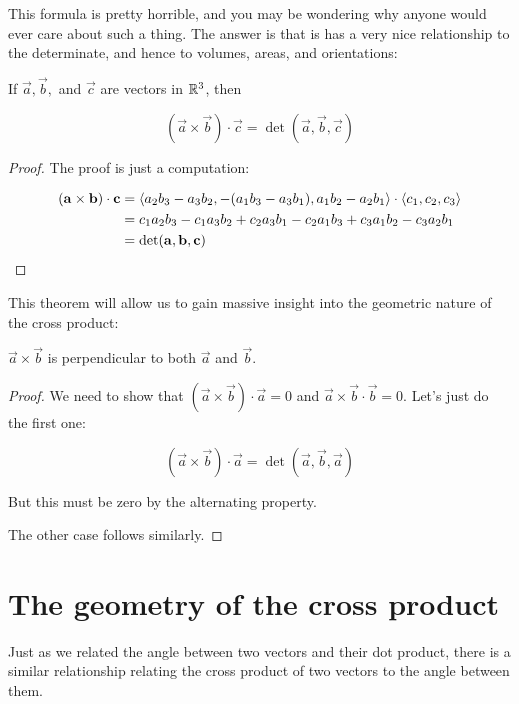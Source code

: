 \documentclass{ximera}
\begin{document}
This formula is pretty horrible, and you may be wondering why anyone
would ever care about such a thing.  The answer is that is has a very
nice relationship to the determinate, and hence to volumes, areas, and
orientations:

\begin{theorem}
  If $\vec{a},\vec{b},$ and $\vec{c}$ are vectors in $\mathbb R^3$, then 
  
  \[
  (\vec{a} \times \vec{b}) \cdot \vec{c} = \det(\vec{a},\vec{b},\vec{c}) 
  \]
\end{theorem}

\begin{proof}
  
  The proof is just a computation:
  
  \begin{align*}
    (\mathbf{a} \times \mathbf{b}) \cdot \mathbf{c} &= \left\langle a_2b_3-a_3b_2, -(a_1b_3-a_3b_1), a_1b_2-a_2b_1\right\rangle \cdot \left\langle c_1,c_2,c_3\right\rangle\\
    &=c_1a_2b_3-c_1a_3b_2+c_2a_3b_1-c_2a_1b_3+c_3a_1b_2-c_3a_2b_1\\
    &=\det(\mathbf{a},\mathbf{b},\mathbf{c}) 
  \end{align*}
\end{proof}

This theorem will allow us to gain massive insight into the geometric nature of the cross product:

\begin{theorem}
  $\vec{a} \times \vec{b}$ is perpendicular to both $\vec{a}$ and $\vec{b}$.
\end{theorem}

\begin{proof}
  We need to show that $(\vec{a} \times \vec{b}) \cdot \vec{a} = 0 $ and $\vec{a} \times \vec{b} \cdot \vec{b} = 0$.  Let's just do the first one:
  
  \[
  (\vec{a} \times \vec{b}) \cdot \vec{a} = \det(\vec{a},\vec{b},\vec{a})
  \]
  
  But this must be zero by the alternating property.
	
  The other case follows similarly.
\end{proof}


\section{The geometry of the cross product}

Just as we related the angle between two vectors and their dot
product, there is a similar relationship relating the cross product of
two vectors to the angle between them.
\end{document}
